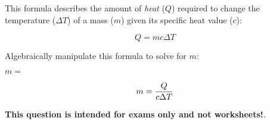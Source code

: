 

This formula describes the amount of {\it heat} ($Q$) required to change the temperature ($\Delta T$) of a mass ($m$) given its specific heat value ($c$):

$$Q = mc \Delta T$$

Algebraically manipulate this formula to solve for $m$:

\vskip 20pt

$m = $







$$m = {Q \over {c \Delta T}}$$







{\bf This question is intended for exams only and not worksheets!}.



